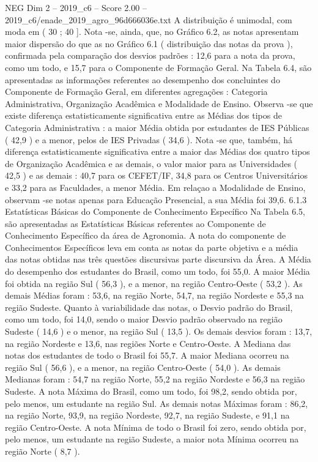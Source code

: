 \begin{textsample}{NEG Dim 2 – 2019\_c6 – Score 2.00 – 2019\_c6/enade\_2019\_agro\_96d666036e.txt}
A distribuição é unimodal, com moda em ( 30 ; 40 ].
Nota -se, ainda, que, no Gráfico 6.2, as notas apresentam maior dispersão do que as no Gráfico 6.1 ( distribuição das notas da prova ), confirmada pela comparação dos desvios padrões : 12,6 para a nota da prova, como um todo, e 15,7 para o Componente de Formação Geral.
Na Tabela 6.4, são apresentadas as informações referentes ao desempenho dos concluintes do Componente de Formação Geral, em diferentes agregações : Categoria Administrativa, Organização Acadêmica e Modalidade de Ensino.
Observa -se que existe diferença estatisticamente significativa entre as Médias dos tipos de Categoria Administrativa : a maior Média obtida por estudantes de IES Públicas ( 42,9 ) e a menor, pelos de IES Privadas ( 34,6 ).
Nota -se que, também, há diferença estatisticamente significativa entre a maior das Médias dos quatro tipos de Organização Acadêmica e as demais, o valor maior para as Universidades ( 42,5 ) e as demais : 40,7 para os CEFET/IF, 34,8 para os Centros Universitários e 33,2 para as Faculdades, a menor Média.
Em relaçao a Modalidade de Ensino, observam -se notas apenas para Educação Presencial, a sua Média foi 39,6. 6.1.3 Estatísticas Básicas do Componente de Conhecimento Específico Na Tabela 6.5, são apresentadas as Estatísticas Básicas referentes ao Componente de Conhecimento Específico da área de Agronomia.
A nota do componente de Conhecimentos Específicos leva em conta as notas da parte objetiva e a média das notas obtidas nas três questões discursivas parte discursiva da Área.
A Média do desempenho dos estudantes do Brasil, como um todo, foi 55,0.
A maior Média foi obtida na região Sul ( 56,3 ), e a menor, na região Centro-Oeste ( 53,2 ).
As demais Médias foram : 53,6, na região Norte, 54,7, na região Nordeste e 55,3 na região Sudeste.
Quanto à variabilidade das notas, o Desvio padrão do Brasil, como um todo, foi 14,0, sendo o maior Desvio padrão observado na região Sudeste ( 14,6 ) e o menor, na região Sul ( 13,5 ).
Os demais desvios foram : 13,7, na região Nordeste e 13,6, nas regiões Norte e Centro-Oeste.
A Mediana das notas dos estudantes de todo o Brasil foi 55,7.
A maior Mediana ocorreu na região Sul ( 56,6 ), e a menor, na região Centro-Oeste ( 54,0 ).
As demais Medianas foram : 54,7 na região Norte, 55,2 na região Nordeste e 56,3 na região Sudeste.
A nota Máxima do Brasil, como um todo, foi 98,2, sendo obtida por, pelo menos, um estudante na região Sul.
As demais notas Máximas foram : 86,2, na região Norte, 93,9, na região Nordeste, 92,7, na região Sudeste, e 91,1 na região Centro-Oeste.
A nota Mínima de todo o Brasil foi zero, sendo obtida por, pelo menos, um estudante na região Sudeste, a maior nota Mínima ocorreu na região Norte ( 8,7 ).

\end{textsample}
